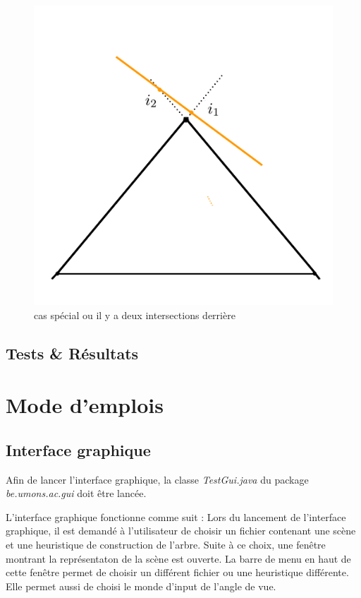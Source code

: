 \documentclass[11pt,a4paper]{article}
\begin{document}
\begin{figure}[!h]
\centering
\includegraphics[scale=0.5]{casSpecial3.png}
\caption{cas spécial ou il y a deux intersections derrière}
\label{exp_6}
\end{figure}
\subsection{Tests \& Résultats}
\section{Mode d'emplois}

\subsection{Interface graphique}

Afin de lancer l'interface graphique, la classe \textit{TestGui.java} du package \textit{be.umons.ac.gui} doit être lancée. 

L'interface graphique fonctionne comme suit :
Lors du lancement de l'interface graphique, il est demandé à l'utilisateur de choisir un fichier contenant une scène et une heuristique de construction de l'arbre. Suite à ce choix, une fenêtre montrant la représentaton de la scène est ouverte. La barre de menu en haut de cette fenêtre permet de choisir un différent fichier ou une heuristique différente. Elle permet aussi de choisi le monde d'input de l'angle de vue.
\end{document}
